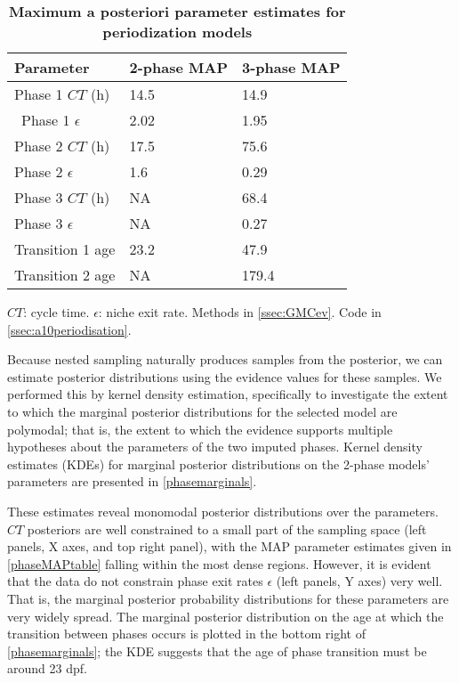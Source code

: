 \begin{table}[!ht]
    \centering
    \caption{{\bf Maximum a posteriori parameter estimates for periodization models}}
    \begin{tabular}{|l|l|l|}
        \hline
        {\bf Parameter} & {\bf 2-phase MAP} & {\bf 3-phase MAP}\\ \hline
        Phase 1 $CT$ (h) & 14.5 & 14.9\\ \hline\
        Phase 1 $\epsilon$ & 2.02 & 1.95\\ \hline
        Phase 2 $CT$ (h) & 17.5 & 75.6\\ \hline
        Phase 2 $\epsilon$ & 1.6 & 0.29\\ \hline
        Phase 3 $CT$ (h) & NA & 68.4\\ \hline
        Phase 3 $\epsilon$ & NA & 0.27\\ \hline
        Transition 1 age & 23.2 & 47.9\\ \hline
        Transition 2 age & NA & 179.4\\ \hline
    \end{tabular}
    \begin{flushleft}
        $CT$: cycle time.
        $\epsilon$: niche exit rate.
        Methods in \autoref{ssec:GMCev}.
        Code in \autoref{ssec:a10periodisation}.    
    \end{flushleft}
    \label{phaseMAPtable}
\end{table}

Because nested sampling naturally produces samples from the posterior, we can estimate posterior distributions using the evidence values for these samples. We performed this by kernel density estimation, specifically to investigate the extent to which the marginal posterior distributions for the selected model are polymodal; that is, the extent to which the evidence supports multiple hypotheses about the parameters of the two imputed phases. Kernel density estimates (KDEs) for marginal posterior distributions on the 2-phase models' parameters are presented in \autoref{phasemarginals}. 

These estimates reveal monomodal posterior distributions over the parameters. $CT$ posteriors are well constrained to a small part of the sampling space (left panels, X axes, and top right panel), with the MAP parameter estimates given in \autoref{phaseMAPtable} falling within the most dense regions. However, it is evident that the data do not constrain phase exit rates $\epsilon$ (left panels, Y axes) very well. That is, the marginal posterior probability distributions for these parameters are very widely spread.  The marginal posterior distribution on the age at which the transition between phases occurs is plotted in the bottom right of \autoref{phasemarginals}; the KDE suggests that the age of phase transition must be around 23 dpf.

